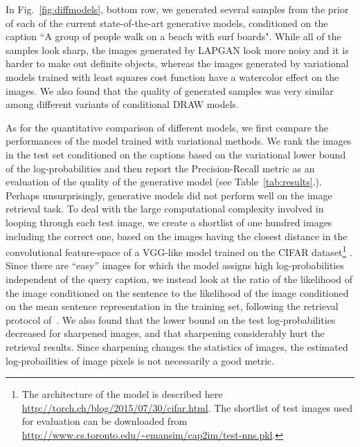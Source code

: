 \documentclass{article} %
\newcommand{\Figref}[1]{Fig.~\ref{#1}}
\begin{document}
In \Figref{fig:diffmodels}, bottom row, we generated several samples from the prior of each of the current state-of-the-art generative models, conditioned on the caption ``A group of people walk on a beach with surf boards". While all of the samples look sharp, the images generated by LAPGAN look more noisy and it is harder to make out definite objects, whereas the images generated by variational models trained with least squares cost function have a watercolor effect on the images. We also found that the quality of generated samples was very similar among different variants of conditional DRAW models.

As for the quantitative comparison of different models, we first compare the performances of the model trained with variational methods. We rank the images in the test set conditioned on the captions based on the variational lower bound of the log-probabilities 
and then report the Precision-Recall metric as an evaluation of the quality of the generative model (see Table~\ref{tab:results}.). Perhaps unsurprisingly, generative models did not perform well on the image retrieval task. To deal with the large computational complexity involved in looping through each test image, we create a shortlist of one hundred images including the correct one, based on the images having the closest distance in the convolutional feature-space of a VGG-like model \citep{simonyan_convnet} trained on the CIFAR dataset\footnote{The architecture of the model is described here \url{http://torch.ch/blog/2015/07/30/cifar.html}. The shortlist of test images used for evaluation can be downloaded from \url{http://www.cs.toronto.edu/~emansim/cap2im/test-nns.pkl}.} \citep{krizhevsky_cifar}. 
Since there are ``easy'' images for which the model assigns high log-probabilities independent of the query caption, 
we instead look at the ratio of 
the likelihood of the image conditioned on the sentence to the likelihood of the image conditioned on the mean sentence representation in the training set, following the retrieval protocol of~\citep{kiros_captions}.
We also found that the lower bound on the test log-probabilities decreased for sharpened images, and that sharpening considerably hurt the retrieval results. Since sharpening changes the statistics of images, the estimated log-probailities of image pixels is not necessarily a good metric.
\end{document}

